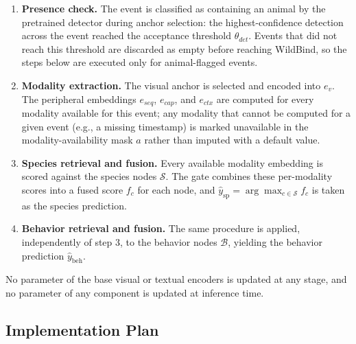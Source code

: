 \begin{enumerate}
\item \textbf{Presence check.} The event is classified as containing an animal by the pretrained detector during anchor selection: the highest-confidence detection across the event reached the acceptance threshold $\theta_{det}$. Events that did not reach this threshold are discarded as empty before reaching WildBind, so the steps below are executed only for animal-flagged events.

\item \textbf{Modality extraction.} The visual anchor is selected and encoded into $e_v$. The peripheral embeddings $e_{seq}$, $e_{cap}$, and $e_{ctx}$ are computed for every modality available for this event; any modality that cannot be computed for a given event (e.g., a missing timestamp) is marked unavailable in the modality-availability mask $a$ rather than imputed with a default value.

\item \textbf{Species retrieval and fusion.} Every available modality embedding is scored against the species nodes $\mathcal{S}$. The gate combines these per-modality scores into a fused score $f_c$ for each node, and $\hat{y}_{\mathrm{sp}}=\arg\max_{c\in\mathcal{S}} f_c$ is taken as the species prediction.

\item \textbf{Behavior retrieval and fusion.} The same procedure is applied, independently of step 3, to the behavior nodes $\mathcal{B}$, yielding the behavior prediction $\hat{y}_{\mathrm{beh}}$.
\end{enumerate}

No parameter of the base visual or textual encoders is updated at any stage, and no parameter of any component is updated at inference time.

\subsection{Implementation Plan}\label{sec:implementation_plan}

